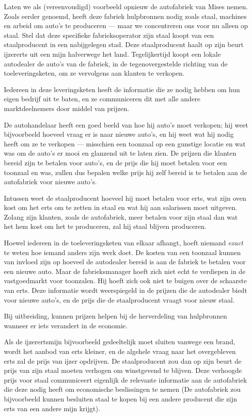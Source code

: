 \documentclass[
  a5paper,
  smalldemyvopaper,11pt,twoside,onecolumn,openright,extrafontsizes]{memoir}
\begin{document}
Laten we als (vereenvoudigd) voorbeeld opnieuw de autofabriek van Mises
nemen. Zoals eerder genoemd, heeft deze fabriek hulpbronnen nodig zoals
staal, machines en arbeid om auto's te produceren --- maar we
concentreren ons voor nu alleen op staal. Stel dat deze specifieke
fabrieksoperator zijn staal koopt van een staalproducent in een
nabijgelegen stad. Deze staalproducent haalt op zijn beurt ijzererts uit
een mijn halverwege het land. Tegelijkertijd koopt een lokale autodealer
de auto's van de fabriek, in de tegenovergestelde richting van de
toeleveringsketen, om ze vervolgens aan klanten te verkopen.

Iedereen in deze leveringsketen heeft de informatie die ze nodig hebben
om hun eigen bedrijf uit te baten, en ze communiceren dit met alle
andere marktdeelnemers door middel van prijzen.

De autohandelaar heeft een goed beeld van hoe hij auto's moet verkopen;
hij weet bijvoorbeeld hoeveel vraag er is naar nieuwe auto's, en hij
weet wat hij nodig heeft om ze te verkopen --- misschien een toonzaal op
een gunstige locatie en wat was om de auto's er mooi en glanzend uit te
laten zien. De prijzen die klanten bereid zijn te betalen voor auto's,
en de prijs die hij moet betalen voor een toonzaal en was, zullen dus
bepalen welke prijs hij zelf bereid is te betalen aan de autofabriek
voor nieuwe auto's.

Intussen weet de staalproducent hoeveel hij moet betalen voor erts, wat
zijn oven kost om het erts om te zetten in staal en wat hij aan
salarissen moet uitgeven. Zolang zijn klanten, zoals de autofabriek,
meer betalen voor zijn staal dan wat het hem kost om het te produceren,
zal hij staal blijven produceren.

Hoewel iedereen in de toeleveringsketen van elkaar afhangt, hoeft
niemand \emph{exact} te weten hoe iemand anders zijn werk doet. De
kosten van een toonzaal kunnen van invloed zijn op hoeveel de autodealer
bereid is aan de fabriek te betalen voor een nieuwe auto. Maar de
fabrieksmanager hoeft zich niet echt te verdiepen in de vastgoedmarkt
voor toonzalen. Hij hoeft zich ook niet te buigen over de schaarste van
erts. Deze informatie wordt weerspiegeld in de prijzen die de autodealer
biedt voor nieuwe auto's, en de prijs die de staalproducent vraagt voor
nieuw staal.

Bij uitbreiding, kunnen prijzen helpen bij de herverdeling van
hulpbronnen wanneer er iets verandert in de economie.

Als de ijzerertsmijn bijvoorbeeld gedeeltelijk moet sluiten vanwege een
brand, wordt het aanbod van erts kleiner, en de algehele vraag naar het
overgebleven erts zal de prijs van ijzer opdrijven. De staalproducent
zou dan op zijn beurt de prijs van zijn staal moeten verhogen om
winstgevend te blijven. Deze verhoogde prijs voor staal communiceert
eigenlijk de relevante informatie aan de autofabriek die deze nodig
heeft om economische beslissingen te nemen (De autofabriek zou
bijvoorbeeld kunnen besluiten staal te kopen bij een andere producent
die zijn erts van een andere mijn krijgt).
\end{document}
